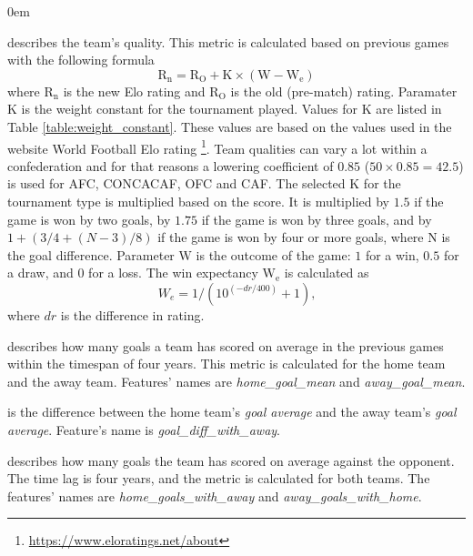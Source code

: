 \begin{description}
    \itemsep0em
    \item[Elo rating] describes the team's quality. This metric is calculated based on previous games with the following formula \begin{equation}
        \mathrm { R } _ { \mathrm { n } } = \mathrm { R } _ { \mathrm { O } } + \mathrm { K } \times \left( \mathrm { W } - \mathrm { W } _ { \mathrm { e } } \right)
    \end{equation}
    where $\mathrm { R } _ { \mathrm { n } }$ is the new Elo rating and $\mathrm { R }  _ { \mathrm { O } }$ is the old (pre-match) rating. Paramater $\mathrm { K }$ is the weight constant for the tournament played. Values for $\mathrm { K }$ are listed in Table \ref{table:weight_constant}. These values are based on the values used in the website World Football Elo rating \footnote{\url{https://www.eloratings.net/about}}. Team qualities can vary a lot within a confederation and for that reasons a lowering coefficient of $0.85$ ($50 \times 0.85 = 42.5$) is used for AFC, CONCACAF, OFC and CAF. The selected $\mathrm { K }$ for the tournament type is multiplied based on the score. It is multiplied by $1.5$ if the game is won by two goals, by $1.75$ if the game is won by three goals, and by $1 + (3/4 + (N-3)/8)$ if the game is won by four or more goals, where N is the goal difference. Parameter $\mathrm { W }$ is the outcome of the game: $1$ for a win, $0.5$ for a draw, and $0$ for a loss. The win expectancy $\mathrm { W } _ { \mathrm { e } }$ is calculated as
    \begin{equation}
        W _ { e } = 1 / \left( 10 ^ { ( - d r / 400 ) } + 1 \right)\text{,}
    \end{equation}
    where $dr$ is the difference in rating.

    \item[Goal average] describes how many goals a team has scored on average in the previous games within the timespan of four years. This metric is calculated for the home team and the away team. Features' names are \textit{home\_goal\_mean} and \textit{away\_goal\_mean}.
    \item[Goal average difference] is the difference between the home team's \textit{goal average} and the away team's \textit{goal average}. Feature's name is \textit{goal\_diff\_with\_away}.
    \item[Goal average with the opponent] describes how many goals the team has scored on average against the opponent. The time lag is four years, and the metric is calculated for both teams. The features' names are \textit{home\_goals\_with\_away} and \textit{away\_goals\_with\_home}.
\end{description}

